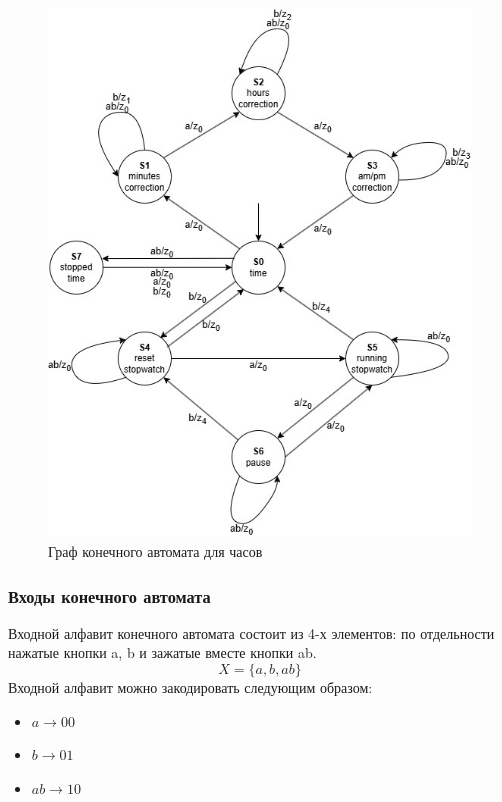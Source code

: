 \documentclass[11pt,a4paper,final]{article} %
\begin{document}
\newpage
\begin{figure}[H]
	\centering
	\includegraphics[width=1.00\linewidth]{img/automaton.jpg}
	\caption{Граф конечного автомата для часов}
	\label{fig:graph}
\end{figure}


\subsubsection{Входы конечного автомата}
Входной алфавит конечного автомата состоит из 4-х элементов: по отдельности нажатые кнопки a, b и зажатые вместе кнопки ab. 
\[X = \{a, b, ab\}\]
Входной алфавит можно закодировать следующим образом:
\begin{itemize}[itemsep=0pt]
	\item $a \rightarrow 00$
	\item $b \rightarrow 01$
	\item $ab \rightarrow 10$
\end{itemize}
\end{document}
